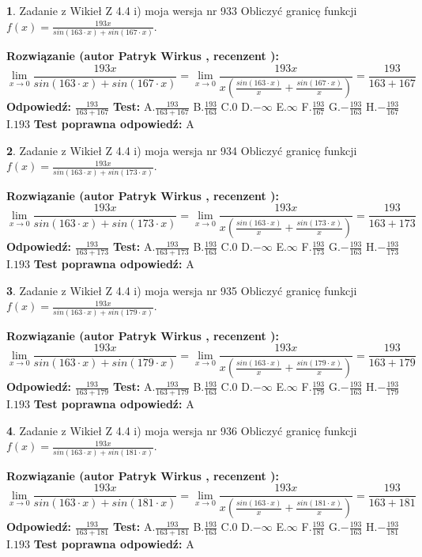 \documentclass[12pt, a4paper]{article}
\theoremstyle{definition} %
\newtheorem{zad}{}
\newcommand{\zadStart}[1]{\begin{zad}#1\newline}
\newcommand{\zadStop}{\end{zad}}
\newcommand{\rozwStart}[2]{\noindent \textbf{Rozwiązanie (autor #1 , recenzent #2): }\newline}
\newcommand{\rozwStop}{\newline}
\newcommand{\odpStart}{\noindent \textbf{Odpowiedź:}\newline}
\newcommand{\odpStop}{\newline}
\newcommand{\testStart}{\noindent \textbf{Test:}\newline}
\newcommand{\testStop}{\newline}
\newcommand{\kluczStart}{\noindent \textbf{Test poprawna odpowiedź:}\newline}
\newcommand{\kluczStop}{\newline}
\begin{document}
\zadStart{Zadanie z Wikieł Z 4.4 i) moja wersja nr 933}
Obliczyć granicę funkcji $f(x)=\frac{193x}{sin(163\cdot x) +sin(167\cdot x)}$.
\zadStop
\rozwStart{Patryk Wirkus}{}
$$\lim\limits_{x\to 0}\frac{193x}{sin(163\cdot x) +sin(167\cdot x)}=\lim\limits_{x\to 0}\frac{193x}{x(\frac{sin(163\cdot x)}{x}+\frac{sin(167\cdot x)}{x})}=\frac{193}{163+167}$$
\rozwStop
\odpStart
$\frac{193}{163+167}$
\odpStop
\testStart
A.$\frac{193}{163+167}$
B.$\frac{193}{163}$
C.$0$
D.$-\infty$
E.$\infty$
F.$\frac{193}{167}$
G.$-\frac{193}{163}$
H.$-\frac{193}{167}$
I.$193$
\testStop
\kluczStart
A
\kluczStop



\zadStart{Zadanie z Wikieł Z 4.4 i) moja wersja nr 934}
Obliczyć granicę funkcji $f(x)=\frac{193x}{sin(163\cdot x) +sin(173\cdot x)}$.
\zadStop
\rozwStart{Patryk Wirkus}{}
$$\lim\limits_{x\to 0}\frac{193x}{sin(163\cdot x) +sin(173\cdot x)}=\lim\limits_{x\to 0}\frac{193x}{x(\frac{sin(163\cdot x)}{x}+\frac{sin(173\cdot x)}{x})}=\frac{193}{163+173}$$
\rozwStop
\odpStart
$\frac{193}{163+173}$
\odpStop
\testStart
A.$\frac{193}{163+173}$
B.$\frac{193}{163}$
C.$0$
D.$-\infty$
E.$\infty$
F.$\frac{193}{173}$
G.$-\frac{193}{163}$
H.$-\frac{193}{173}$
I.$193$
\testStop
\kluczStart
A
\kluczStop



\zadStart{Zadanie z Wikieł Z 4.4 i) moja wersja nr 935}
Obliczyć granicę funkcji $f(x)=\frac{193x}{sin(163\cdot x) +sin(179\cdot x)}$.
\zadStop
\rozwStart{Patryk Wirkus}{}
$$\lim\limits_{x\to 0}\frac{193x}{sin(163\cdot x) +sin(179\cdot x)}=\lim\limits_{x\to 0}\frac{193x}{x(\frac{sin(163\cdot x)}{x}+\frac{sin(179\cdot x)}{x})}=\frac{193}{163+179}$$
\rozwStop
\odpStart
$\frac{193}{163+179}$
\odpStop
\testStart
A.$\frac{193}{163+179}$
B.$\frac{193}{163}$
C.$0$
D.$-\infty$
E.$\infty$
F.$\frac{193}{179}$
G.$-\frac{193}{163}$
H.$-\frac{193}{179}$
I.$193$
\testStop
\kluczStart
A
\kluczStop



\zadStart{Zadanie z Wikieł Z 4.4 i) moja wersja nr 936}
Obliczyć granicę funkcji $f(x)=\frac{193x}{sin(163\cdot x) +sin(181\cdot x)}$.
\zadStop
\rozwStart{Patryk Wirkus}{}
$$\lim\limits_{x\to 0}\frac{193x}{sin(163\cdot x) +sin(181\cdot x)}=\lim\limits_{x\to 0}\frac{193x}{x(\frac{sin(163\cdot x)}{x}+\frac{sin(181\cdot x)}{x})}=\frac{193}{163+181}$$
\rozwStop
\odpStart
$\frac{193}{163+181}$
\odpStop
\testStart
A.$\frac{193}{163+181}$
B.$\frac{193}{163}$
C.$0$
D.$-\infty$
E.$\infty$
F.$\frac{193}{181}$
G.$-\frac{193}{163}$
H.$-\frac{193}{181}$
I.$193$
\testStop
\kluczStart
A
\kluczStop
\end{document}
